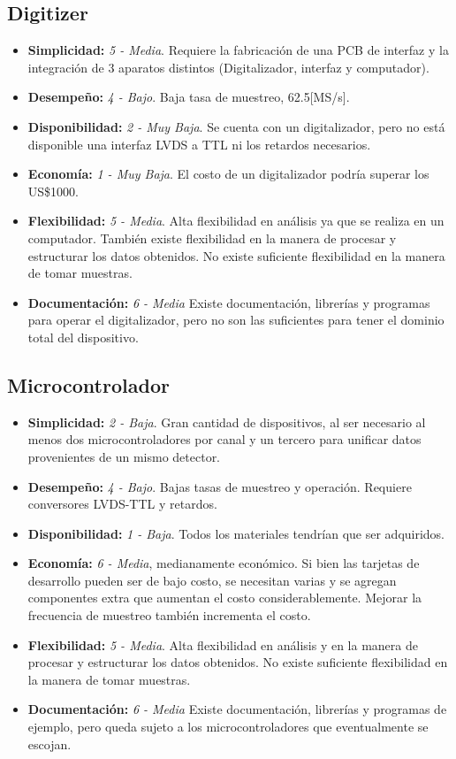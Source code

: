 \subsection{Digitizer}
\begin{itemize}
	\item \textbf{Simplicidad:} \textit{5 - Media}. Requiere la fabricación de una PCB de interfaz y la integración de 3 aparatos distintos (Digitalizador, interfaz y computador).
	\item \textbf{Desempeño:} \textit{4 - Bajo}. Baja tasa de muestreo, 62.5[MS/s].
	\item \textbf{Disponibilidad:} \textit{2 - Muy Baja}. Se cuenta con un digitalizador, pero no está disponible una interfaz LVDS a TTL ni los retardos necesarios.
	\item \textbf{Economía:} \textit{1 - Muy Baja}. El costo de  un  digitalizador podría superar los US\$1000.
	\item \textbf{Flexibilidad:} \textit{5 - Media}. Alta flexibilidad en análisis ya que se realiza en un computador. También existe flexibilidad en la manera de procesar y estructurar los datos obtenidos. No existe suficiente flexibilidad en la manera de tomar muestras.
	\item \textbf{Documentación:} \textit{6 - Media} Existe documentación, librerías y programas para operar el digitalizador, pero no son las suficientes para tener el dominio total del dispositivo.
\end{itemize}

\subsection{Microcontrolador}
\begin{itemize}
	\item \textbf{Simplicidad: } \textit{2 - Baja}. Gran cantidad de dispositivos, al ser necesario al menos dos microcontroladores por canal y un tercero para unificar datos provenientes de un mismo detector.
	\item \textbf{Desempeño: } \textit{4 - Bajo}. Bajas tasas de muestreo y operación. Requiere conversores LVDS-TTL y retardos.
	\item \textbf{Disponibilidad: } \textit{1 - Baja}. Todos los materiales tendrían que ser adquiridos.
	\item \textbf{Economía: } \textit{6 - Media}, medianamente económico. Si bien las tarjetas de desarrollo pueden ser de bajo costo, se necesitan varias y se agregan componentes extra que aumentan el costo considerablemente. Mejorar la frecuencia de muestreo también incrementa el costo.
	\item \textbf{Flexibilidad:} \textit{5 - Media}. Alta flexibilidad en análisis y en la manera de procesar y estructurar los datos obtenidos. No existe suficiente flexibilidad en la manera de tomar muestras.
	\item \textbf{Documentación:} \textit{6 - Media} Existe documentación, librerías y programas de ejemplo, pero queda sujeto a los microcontroladores que eventualmente se escojan.
\end{itemize}

